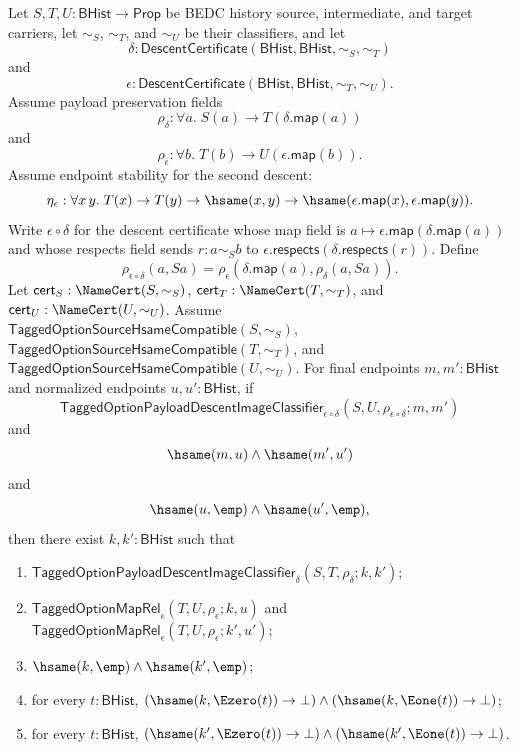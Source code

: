 \begin{theorem}
Let $S,T,U:\mathsf{BHist}\to\mathsf{Prop}$ be BEDC history source,
intermediate, and target carriers, let $\sim_S$, $\sim_T$, and $\sim_U$ be their
classifiers, and let
$$
\delta:\mathsf{DescentCertificate}(\mathsf{BHist},\mathsf{BHist},\sim_S,\sim_T)
$$
and
$$
\epsilon:\mathsf{DescentCertificate}(\mathsf{BHist},\mathsf{BHist},\sim_T,\sim_U).
$$
Assume payload preservation fields
$$
\rho_{\delta}:\forall a.\;S(a)\to T(\delta.\mathsf{map}(a))
$$
and
$$
\rho_{\epsilon}:\forall b.\;T(b)\to U(\epsilon.\mathsf{map}(b)).
$$
Assume endpoint stability for the second descent:
$$
\eta_{\epsilon}:\forall x\,y.\;
T(x)\to T(y)\to \hsame(x,y)\to
\hsame(\epsilon.\mathsf{map}(x),\epsilon.\mathsf{map}(y)).
$$
Write $\epsilon\circ\delta$ for the descent certificate whose map field is
$a\mapsto\epsilon.\mathsf{map}(\delta.\mathsf{map}(a))$ and whose respects field
sends $r:a\sim_S b$ to
$\epsilon.\mathsf{respects}(\delta.\mathsf{respects}(r))$. Define
$$
\rho_{\epsilon\circ\delta}(a,Sa)=
\rho_{\epsilon}(\delta.\mathsf{map}(a),\rho_{\delta}(a,Sa)).
$$
Let $\mathsf{cert}_S:\NameCert(S,\sim_S)$,
$\mathsf{cert}_T:\NameCert(T,\sim_T)$, and
$\mathsf{cert}_U:\NameCert(U,\sim_U)$. Assume
$\mathsf{TaggedOptionSourceHsameCompatible}(S,\sim_S)$,
$\mathsf{TaggedOptionSourceHsameCompatible}(T,\sim_T)$, and
$\mathsf{TaggedOptionSourceHsameCompatible}(U,\sim_U)$. For final endpoints
$m,m':\mathsf{BHist}$ and normalized endpoints $u,u':\mathsf{BHist}$, if
$$
\mathsf{TaggedOptionPayloadDescentImageClassifier}_{\epsilon\circ\delta}
(S,U,\rho_{\epsilon\circ\delta};m,m')
$$
and
$$
\hsame(m,u)\land \hsame(m',u')
$$
and
$$
\hsame(u,\emp)\land \hsame(u',\emp),
$$
then there exist $k,k':\mathsf{BHist}$ such that
\begin{enumerate}
\item $\mathsf{TaggedOptionPayloadDescentImageClassifier}_{\delta}
(S,T,\rho_{\delta};k,k')$;
\item $\mathsf{TaggedOptionMapRel}_{\epsilon}(T,U,\rho_{\epsilon};k,u)$ and
$\mathsf{TaggedOptionMapRel}_{\epsilon}(T,U,\rho_{\epsilon};k',u')$;
\item $\hsame(k,\emp)\land \hsame(k',\emp)$;
\item for every $t:\mathsf{BHist}$,
$(\hsame(k,\Ezero(t))\to\bot)\land(\hsame(k,\Eone(t))\to\bot)$;
\item for every $t:\mathsf{BHist}$,
$(\hsame(k',\Ezero(t))\to\bot)\land(\hsame(k',\Eone(t))\to\bot)$.
\end{enumerate}
\end{theorem}
